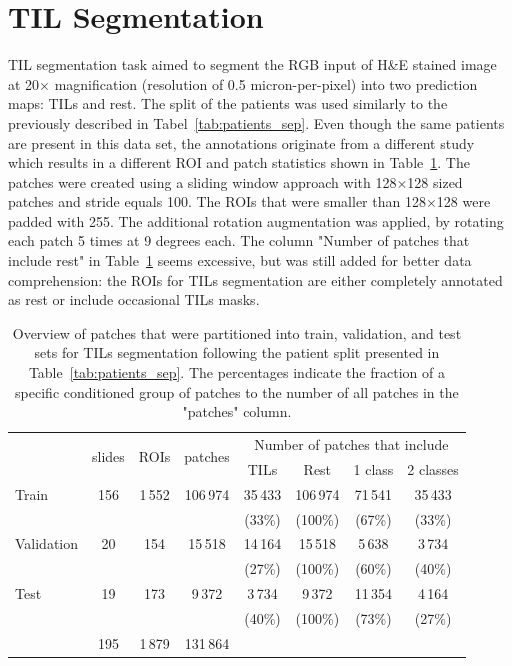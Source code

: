 \section{TIL Segmentation}
TIL segmentation task aimed to segment the RGB input of H\&E stained image at 20$\times$ magnification
(resolution of 0.5 micron-per-pixel) into two prediction maps: TILs and rest.
The split of the patients was used similarly to the previously described in
Tabel~\ref*{tab:patients_sep}. Even though the same patients are present in
this data set, the annotations originate from a different
study which results in a different ROI and patch statistics shown in
Table~\ref*{tab:patch_sep_tils}. The patches were created using a sliding
window approach with 128$\times$128 sized patches
and stride equals 100. The ROIs that were smaller than 128$\times$128
were padded with 255. The additional rotation augmentation was applied,
by rotating each patch 5 times at 9 degrees each.
The column "Number of patches that include rest" in Table~\ref*{tab:patch_sep_tils}
seems excessive, but was still added
for better data comprehension: the ROIs for TILs segmentation are either
completely annotated as rest or include occasional TILs masks.

\begin{table}[h!]
    \centering
    \begin{tabular}{ l c c c c c c c }
        \hline
        & \multirow{2}{*}{slides} & \multirow{2}{*}{ROIs}& \multirow{2}{*}{patches}& \multicolumn{4}{c}{Number of patches that include}\\ 
        \cline{5-8}
        & & & & TILs & Rest & 1 class & 2 classes \\
        \hline
        Train & 156 & 1\,552 & 106\,974 & 35\,433 & 106\,974 & 71\,541 & 35\,433\\
         &  &  &  & (33\%) & (100\%) & (67\%) & (33\%)  \\
        Validation & 20 & 154 & 15\,518 & 14\,164 & 15\,518 & 5\,638 & 3\,734 \\
         &  &  &  & (27\%) & (100\%) & (60\%) & (40\%)\\
        Test & 19 & 173 & 9\,372 & 3\,734 & 9\,372& 11\,354 & 4\,164\\
         &  &  &  & (40\%) & (100\%) & (73\%) & (27\%)\\
        \hline
        & 195 & 1\,879 & 131\,864 &  &  &  & \\
    \end{tabular}
    \caption{\label{tab:patch_sep_tils} Overview of patches that were partitioned into train, validation,
    and test sets for TILs segmentation following the patient split presented in Table~\ref*{tab:patients_sep}.
    The percentages indicate the fraction of a specific conditioned
    group of patches to the number of all patches in the "patches" column.}
\end{table}

